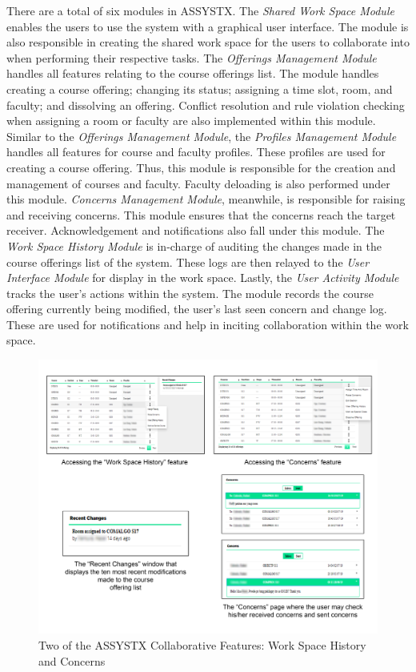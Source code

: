 There are a total of six modules in ASSYSTX. The \textit{Shared Work Space Module} enables the users to use the system with a graphical user interface. The module is also responsible in creating the shared work space for the users to collaborate into when performing their respective tasks. The \textit{Offerings Management Module} handles all features relating to the course offerings list. The module handles creating a course offering; changing its status; assigning a time slot, room, and faculty; and dissolving an offering. Conflict resolution and rule violation checking when assigning a room or faculty are also implemented within this module. Similar to the \textit{Offerings Management Module}, the \textit{Profiles Management Module} handles all features for course and faculty profiles. These profiles are used for creating a course offering. Thus, this module is responsible for the creation and management of courses and faculty. Faculty deloading is also performed under this module. \textit{Concerns Management Module}, meanwhile, is responsible for raising and receiving concerns. This module ensures that the concerns reach the target receiver. Acknowledgement and notifications also fall under this module. The \textit{Work Space History Module} is in-charge of auditing the changes made in the course offerings list of the system. These logs are then relayed to the \textit{User Interface Module} for display in the work space. Lastly, the \textit{User Activity Module} tracks the user's actions within the system. The module records the course offering currently being modified, the user's last seen concern and change log. These are used for notifications and help in inciting collaboration within the work space.

\begin{figure}[h]
   \centering
 \includegraphics[width=\textwidth,height=\textheight,keepaspectratio]{PCSC2019_latex/Screenshots/assystxScreenshots.png}
   \caption{Two of the ASSYSTX Collaborative Features: Work Space History and Concerns} \label{fig:assystxScreenshot}
\end{figure}

